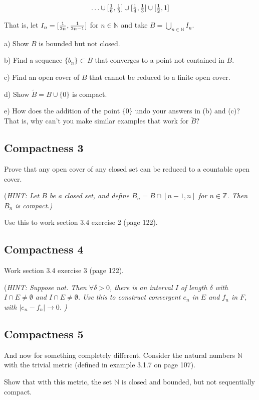 \documentclass[11pt]{article}
\newcommand{\N}{\mathbb{N}}
\newcommand{\Z}{\mathbb{Z}}
\begin{document}
$$\textstyle  \ldots  \cup [{1\over 6}, {1\over 5}] \cup [{1\over 4},{1\over 3}] \cup  [{1\over 2},1] $$

That is, let $I_n= [{1\over 2n},{1\over 2n-1}]$ for $n\in \N$ and take $B=\bigcup_{n\in\N} I_n $. 

a) Show $B$ is bounded but not closed. 

b) Find a sequence $\{b_n\}\subset B$ that converges to a point not contained in $B$.

c) Find an open cover of $B$ that cannot be reduced to a finite open cover. 

d) Show $\tilde B = B\cup\{0\}$ is compact.

e) How does the addition of the point $\{0\}$ undo your answers in (b) and (c)? That is, why can't you make similar examples that work for $\tilde B$?


\subsection*{Compactness 3}

Prove that any open cover of any closed set can be reduced to a countable open cover. 

(\sl HINT: Let $B$ be a closed set, and define $B_n= B\cap [n-1,n]$ for $n\in\Z$. Then $B_n$ is compact.\rm) 

Use this to work section 3.4 exercise 2 (page 122). 

\subsection*{Compactness 4}

Work section 3.4 exercise 3 (page 122). 

(\sl HINT: Suppose not. Then $\forall \delta>0$, there is an interval $I$ of length $\delta$ with $I\cap E \not= \emptyset$ and $I\cap E \not= \emptyset$. Use this to construct convergent $e_n$ in $E$ and $f_n$ in $F$, with $|e_n-f_n|\to 0$. )  \rm


\subsection*{Compactness 5}

And now for something completely different. Consider the natural numbers $\N$ with the trivial metric (defined in example 3.1.7 on page 107). 

Show that with this metric, the set $\N$ is closed and bounded, but not sequentially compact.
\end{document}
